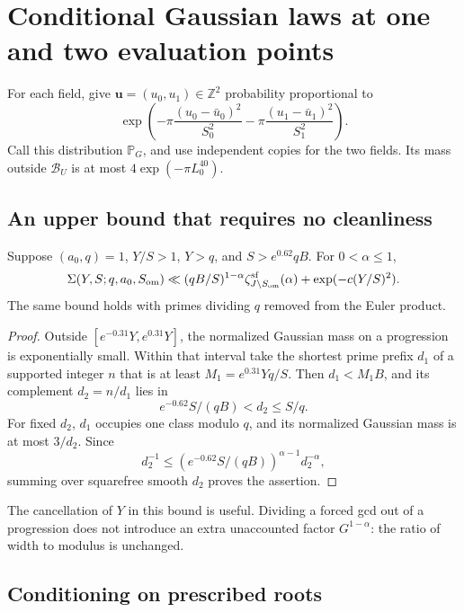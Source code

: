 \section{Conditional Gaussian laws at one and two evaluation points}
\label{sec:gaussian}

For each field, give \(\mathbf u=(u_0,u_1)\in\mathbb Z^2\) probability
proportional to
\[
 \exp\left(-\pi\frac{(u_0-\bar u_0)^2}{S_0^2}
           -\pi\frac{(u_1-\bar u_1)^2}{S_1^2}\right).
\]
Call this distribution \(\mathbb P_G\), and use independent copies for
the two fields.  Its mass outside \(\mathcal B_U\) is at most
\(4\exp(-\pi L_0^{40})\).

\subsection{An upper bound that requires no cleanliness}

\begin{lemma}\label{lem:rankin}
Suppose \((a_0,q)=1\), \(Y/S>1\), \(Y>q\), and
\(S>e^{0.62}qB\).  For \(0<\alpha\le1\),
\[
 \Sigma(Y,S;q,a_0,S_{\rm om})
 \ll (qB/S)^{1-\alpha}\zeta_{J\setminus S_{\rm om}}^{\rm sf}(\alpha)
       +\exp(-c(Y/S)^2).
\]
The same bound holds with primes dividing \(q\) removed from the
Euler product.
\end{lemma}

\begin{proof}
Outside \([e^{-0.31}Y,e^{0.31}Y]\), the normalized Gaussian mass on a
progression is exponentially small.  Within that interval take the
shortest prime prefix \(d_1\) of a supported integer \(n\) that is at
least \(M_1=e^{0.31}Yq/S\).  Then \(d_1<M_1B\), and its complement
\(d_2=n/d_1\) lies in
\[
 e^{-0.62}S/(qB)<d_2\le S/q.
\]
For fixed \(d_2\), \(d_1\) occupies one class modulo \(q\), and its
normalized Gaussian mass is at most \(3/d_2\).  Since
\[
 d_2^{-1}\le(e^{-0.62}S/(qB))^{\alpha-1}d_2^{-\alpha},
\]
summing over squarefree smooth \(d_2\) proves the assertion.
\end{proof}

The cancellation of \(Y\) in this bound is useful.  Dividing a forced
gcd out of a progression does not introduce an extra unaccounted factor
\(G^{1-\alpha}\): the ratio of width to modulus is unchanged.

\subsection{Conditioning on prescribed roots}

